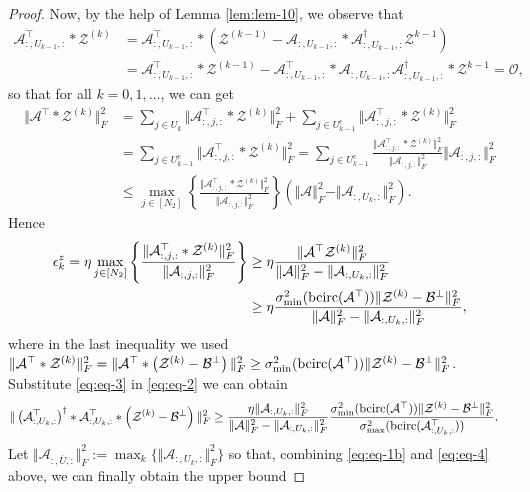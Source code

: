 \documentclass[11pt]{article}
\def\fm#1{\mathcal{#1}}
\def \a#1{\fm A_{:, #1, :}}
\begin{document}
\begin{proof}
Now,  by the help of Lemma \ref{lem:lem-10}, we observe that
\begin{align*}
    \a{U_{k-1}}^\top *\fm Z^{(k)} & = \a{U_{k-1}}^\top *\left( \fm Z^{(k-1)} - \a{U_{k-1}}*\a{U_{k-1}}^\dagger \fm Z^{k-1} \right)\\
    & =  \a{U_{k-1}}^\top*\fm Z^{(k-1)} - \a{U_{k-1}}^\top *\a{U_{k-1}}\a{U_{k-1}}^\dagger* \fm Z^{k-1} = \fm O, 
\end{align*}
so that for all $k=0, 1, \ldots$, we can get
\begin{align*}
    \Vert \fm A^\top * \fm Z^{(k)}\Vert_F^2  & = \sum_{j \in U_k} \Vert \a j ^\top  * \fm Z^{(k)} \Vert_F^2 + \sum_{j\in U^c_{k-1}}\Vert \a j ^\top  * \fm Z^{(k)} \Vert_F^2 \\
    &=  \sum_{j\in U^c_{k-1}}\Vert \a j ^\top  * \fm Z^{(k)} \Vert_F^2  =  \sum_{j\in U^c_{k-1}} \frac{ \Vert \a j ^\top  * \fm Z^{(k)} \Vert_F^2}{ \Vert \a j \Vert_F^2}\Vert \a j \Vert_F^2\\
    & \leq \max_{j \in [N_2]}\left\{  \frac{ \Vert \a j ^\top  * \fm Z^{(k)} \Vert_F^2}{ \Vert \a j \Vert_F^2} \right\}\left(\Vert \fm A \Vert_F^2 - \Vert \a{U_k} \Vert_F^2 \right).
\end{align*}
Hence
\begin{align}
    \epsilon^z_k = \eta \max_{j \in [N_2]}\left\{  \frac{ \Vert \a j ^\top  * \fm Z^{(k)} \Vert_F^2}{ \Vert \a j \Vert_F^2} \right\} &\geq \eta \frac{ \Vert \fm A^\top \fm Z^{(k)}\Vert_F^2}{\Vert \fm A \Vert_F^2 - \Vert \a{U_k} \Vert_F^2} \notag\\
    & \geq \eta\frac{ \sigma_{\min}^2(\bcirc(\fm A^\top)) \Vert \fm Z^{(k)}-\fm B^\perp \Vert_F^2}{\Vert \fm A \Vert_F^2 - \Vert \a{U_k} \Vert_F^2},  \label{eq:eq-3}
\end{align}
where in the last inequality we used $ \Vert \fm A^\top *  \fm Z^{(k)}\Vert_F^2 =  \Vert \fm A^\top * \left( \fm Z^{(k)} - \fm B^\perp \right)\Vert_F^2 \geq \sigma_{\min}^2(\bcirc(\fm A^\top)) \Vert \fm Z^{(k)}-\fm B^\perp \Vert_F^2 $.\\
Substitute \eqref{eq:eq-3} in \eqref{eq:eq-2} we can obtain
\begin{align}
     \Vert \left(\a{U_k}^\top \right)^\dagger * \a{U_k}^\top *\left(\fm Z^{(k)}-\fm B^\perp \right) \Vert_F^2 & \geq \frac{\eta \Vert \a{U_k} \Vert_F^2}{\Vert \fm A \Vert_F^2 - \Vert \a{U_k} \Vert_F^2} \frac{\sigma_{\min}^2(\bcirc(\fm A^\top)) \Vert \fm Z^{(k)}-\fm B^\perp \Vert_F^2}{\sigma_{\max}^2(\bcirc(\a{U_k}^\top))}. \label{eq:eq-4}
\end{align}
Let $\Vert \a{\overline{U}} \Vert_F^2 := \max_k \{ \Vert \a{U_k}\Vert_F^2\}$ so that, combining \eqref{eq:eq-1b} and  \eqref{eq:eq-4} above, we can finally obtain the upper bound

\end{proof}
\end{document}
